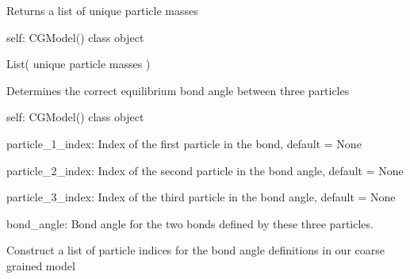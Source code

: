\documentclass[letterpaper,12pt,english,openany,oneside]{sphinxmanual}
\begin{document}
\begin{fulllineitems}
\begin{fulllineitems}
\end{fulllineitems}


\begin{fulllineitems}
\label{\detokenize{cg_model:cg_model.cgmodel.CGModel.get_all_particle_masses}}
Returns a list of unique particle masses

self: CGModel() class object

List( unique particle masses )

\end{fulllineitems}


\begin{fulllineitems}
\label{\detokenize{cg_model:cg_model.cgmodel.CGModel.get_bond_angle_force_constant}}
Determines the correct equilibrium bond angle between three particles

self: CGModel() class object

particle\_1\_index: Index of the first particle in the bond, default = None

particle\_2\_index: Index of the second particle in the bond angle, default = None

particle\_3\_index: Index of the third particle in the bond angle, default = None

bond\_angle: Bond angle for the two bonds defined by these three particles.

\end{fulllineitems}


\begin{fulllineitems}
\label{\detokenize{cg_model:cg_model.cgmodel.CGModel.get_bond_angle_list}}
Construct a list of particle indices for the bond angle definitions in our coarse grained model


\end{fulllineitems}
\end{fulllineitems}
\end{document}
